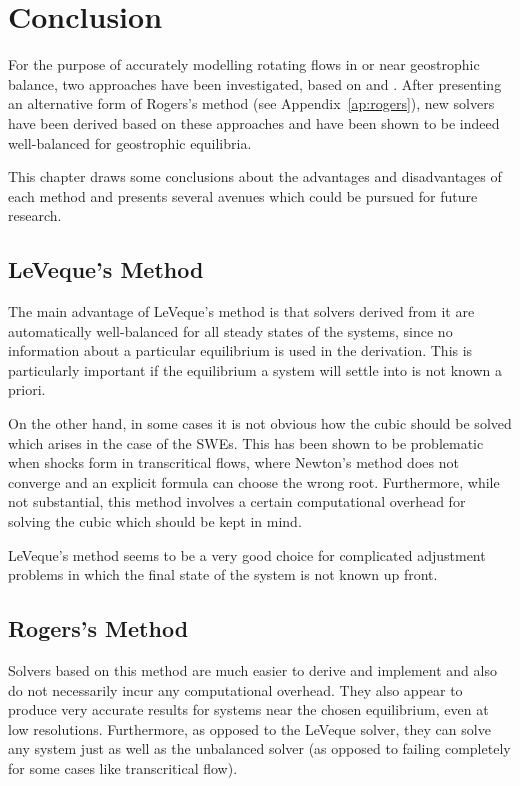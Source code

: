 \chapter{Conclusion}
\label{ch:conclusion}

For the purpose of accurately modelling rotating flows in or near geostrophic balance, two approaches have been investigated, based on \cite{leveque1998balancing} and \cite{rogers2003mathematical}. After presenting an alternative form of Rogers's method (see Appendix~\ref{ap:rogers}), new solvers have been derived based on these approaches and have been shown to be indeed well-balanced for geostrophic equilibria.

This chapter draws some conclusions about the advantages and disadvantages of each method and presents several avenues which could be pursued for future research.

\section{LeVeque's Method}

The main advantage of LeVeque's method is that solvers derived from it are automatically well-balanced for all steady states of the systems, since no information about a particular equilibrium is used in the derivation. This is particularly important if the equilibrium a system will settle into is not known a priori.

On the other hand, in some cases it is not obvious how the cubic should be solved which arises in the case of the SWEs. This has been shown to be problematic when shocks form in transcritical flows, where Newton's method does not converge and an explicit formula can choose the wrong root. Furthermore, while not substantial, this method involves a certain computational overhead for solving the cubic which should be kept in mind.

LeVeque's method seems to be a very good choice for complicated adjustment problems in which the final state of the system is not known up front.

\section{Rogers's Method}

Solvers based on this method are much easier to derive and implement and also do not necessarily incur any computational overhead. They also appear to produce very accurate results for systems near the chosen equilibrium, even at low resolutions. Furthermore, as opposed to the LeVeque solver, they can solve any system just as well as the unbalanced solver (as opposed to failing completely for some cases like transcritical flow).

